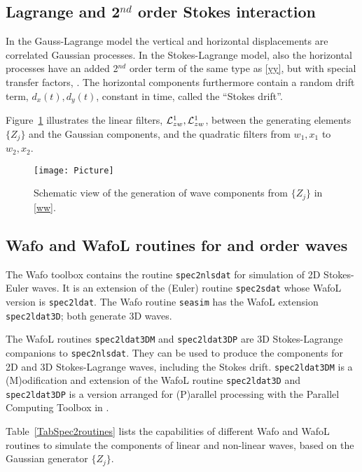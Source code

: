 \subsection{Lagrange and 2$^{nd}$ order Stokes interaction}
In the Gauss-Lagrange model the vertical and horizontal displacements are 
correlated Gaussian processes. In the Stokes-Lagrange model, 
also the horizontal processes have an added 2$^{nd}$ order term 
of the same type as \eqref{yy}, but with special transfer factors, \cite{fouqueskrogstadmyrhaug2006,Nouguieretal2015,Prevosto1998}. 
The horizontal components furthermore contain a random drift term, $d_x(t), d_y(t)$, 
constant in time, called the ``Stokes drift''.

 Figure~\ref{FigFilter} illustrates the linear filters, ${\cal L}_{zw}^1, {\cal L}_{zw}^1$, between the generating elements $\{Z_j\}$ and the Gaussian components, and the quadratic filters from 
$w_1, x_1$ to $w_2, x_2$.  

\begin{figure}
\centerline{
\texttt{[image: Picture]}
}
\caption{Schematic view of the generation of wave components from $\{Z_j\}$  in \eqref{ww}.}
\label{FigFilter}
\end{figure}

\subsection{{\sc Wafo} and {\sc WafoL} routines for \fo and \so order waves}
The {\sc Wafo} toolbox contains the routine {\tt spec2nlsdat} for simulation of 
2D Stokes-Euler waves. It is an extension of the (Euler) routine {\tt spec2sdat} whose {\sc Wafo}L version is {\tt spec2ldat}. The {\sc Wafo} routine {\tt seasim} has the {\sc Wafo}L extension {\tt spec2ldat3D}; both generate 3D waves. 
 
The {\sc Wafo}L routines  {\tt spec2ldat3DM} and {\tt spec2ldat3DP} are 3D Stokes-Lagrange companions to  {\tt spec2nlsdat}. They can be used to produce the components for 2D and 3D Stokes-Lagrange waves, including the Stokes drift. 
{\tt spec2ldat3DM} is a (M)odification and extension 
of the {\sc Wafo}L routine {\tt spec2ldat3D} and {\tt spec2ldat3DP} is a version arranged for (P)arallel processing with the  Parallel Computing Toolbox in \ML{}. 

Table~\ref{TabSpec2routines} lists the capabilities of different {\sc Wafo} and {\sc Wafo}L routines to simulate the components of linear and non-linear waves, based on the Gaussian generator $\{Z_j\}$.  

